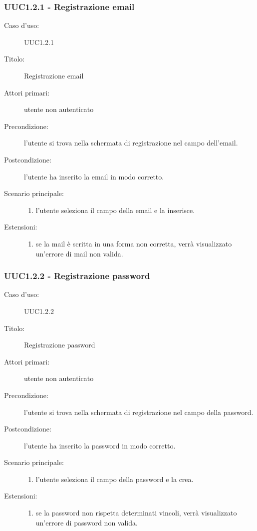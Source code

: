 \documentclass[casi-duso]{subfiles}
\begin{document}
\subsubsection{UUC1.2.1 - Registrazione email}%
\label{subsub:UUC1.2.1utente}
\begin{description}
  \item[Caso d’uso:] UUC1.2.1
  \item[Titolo:] Registrazione email
  \item[Attori primari:] utente non autenticato
  \item[Precondizione:] l'utente si trova nella schermata di registrazione nel campo dell'email.
  \item[Postcondizione:] l'utente ha inserito la email in modo corretto.
  \item[Scenario principale:]
        \begin{enumerate}
          \item l'utente seleziona il campo della email e la inserisce.
        \end{enumerate}
  \item[Estensioni:]
        \begin{enumerate}
          \item se la mail è scritta in una forma non corretta, verrà visualizzato un'errore di mail non valida.
        \end{enumerate}
\end{description}

\subsubsection{UUC1.2.2 - Registrazione password}%
\label{subsub:UUC1.2.2utente}
\begin{description}
  \item[Caso d’uso:] UUC1.2.2
  \item[Titolo:] Registrazione password
  \item[Attori primari:] utente non autenticato
  \item[Precondizione:] l'utente si trova nella schermata di registrazione nel campo della password.
  \item[Postcondizione:] l'utente ha inserito la password in modo corretto.
  \item[Scenario principale:]
        \begin{enumerate}
          \item l'utente seleziona il campo della password e la crea.
        \end{enumerate}
  \item[Estensioni:]
        \begin{enumerate}
          \item se la password non rispetta determinati vincoli, verrà visualizzato un'errore di password non valida.
        \end{enumerate}
\end{description}
\end{document}

